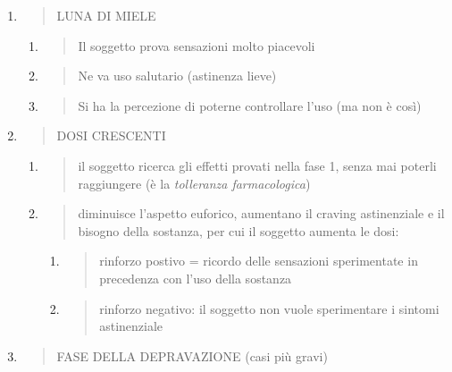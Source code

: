 \documentclass[]{article}
\begin{document}
\begin{enumerate}
\def\labelenumi{\arabic{enumi}.}
\item
  \begin{quote}
  LUNA DI MIELE
  \end{quote}

  \begin{enumerate}
  \def\labelenumii{\alph{enumii}.}
  \item
    \begin{quote}
    Il soggetto prova sensazioni molto piacevoli
    \end{quote}
  \item
    \begin{quote}
    Ne va uso salutario (astinenza lieve)
    \end{quote}
  \item
    \begin{quote}
    Si ha la percezione di poterne controllare l'uso (ma non è così)
    \end{quote}
  \end{enumerate}
\item
  \begin{quote}
  DOSI CRESCENTI
  \end{quote}

  \begin{enumerate}
  \def\labelenumii{\alph{enumii}.}
  \item
    \begin{quote}
    il soggetto ricerca gli effetti provati nella fase 1, senza mai
    poterli raggiungere (è la \emph{tolleranza farmacologica})
    \end{quote}
  \item
    \begin{quote}
    diminuisce l'aspetto euforico, aumentano il craving astinenziale e
    il bisogno della sostanza, per cui il soggetto aumenta le dosi:
    \end{quote}

    \begin{enumerate}
    \def\labelenumiii{\roman{enumiii}.}
    \item
      \begin{quote}
      rinforzo postivo = ricordo delle sensazioni sperimentate in
      precedenza con l'uso della sostanza
      \end{quote}
    \item
      \begin{quote}
      rinforzo negativo: il soggetto non vuole sperimentare i sintomi
      astinenziale
      \end{quote}
    \end{enumerate}
  \end{enumerate}
\item
  \begin{quote}
  FASE DELLA DEPRAVAZIONE (casi più gravi)
  \end{quote}


\end{enumerate}
\end{document}
